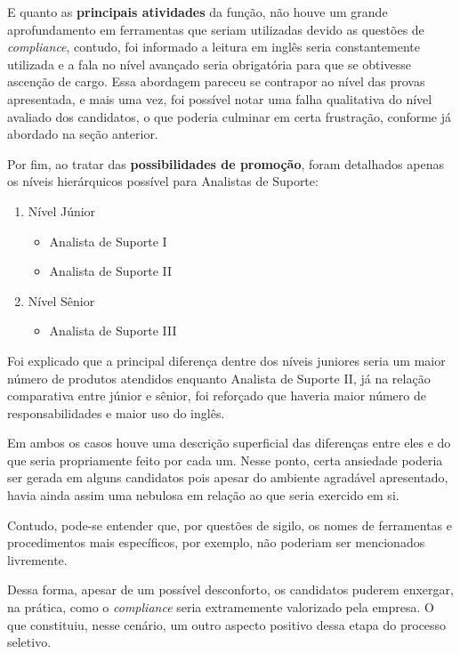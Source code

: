 \documentclass[12pt]{article}
\begin{document}
E quanto as \textbf{principais atividades} da função, não houve um grande aprofundamento em ferramentas que seriam utilizadas devido as questões de \emph{compliance}, contudo, foi informado a leitura em inglês seria constantemente utilizada e a fala no nível avançado seria obrigatória para que se obtivesse ascenção de cargo. Essa abordagem pareceu se contrapor ao nível das provas apresentada, e mais uma vez, foi possível notar uma falha qualitativa do nível avaliado dos candidatos, o que poderia culminar em certa frustração, conforme já abordado na seção anterior. 

Por fim, ao tratar das \textbf{possibilidades de promoção}, foram detalhados apenas os níveis hierárquicos possível para Analistas de Suporte: 

\newpage

\begin{enumerate}
   \item Nível Júnior
   \begin{itemize}
     \item Analista de Suporte I
     \item  Analista de Suporte II
   \end{itemize}
   \item Nível Sênior
   \begin{itemize}
     \item Analista de Suporte III
     \end{itemize}
\end{enumerate}

Foi explicado que a principal diferença dentre dos níveis juniores seria um maior número de produtos atendidos enquanto Analista de Suporte II, já na relação comparativa entre júnior e sênior, foi reforçado que haveria maior número de responsabilidades e maior uso do inglês. 

Em ambos os casos houve uma descrição superficial das diferenças entre eles e do que seria propriamente feito por cada um. Nesse ponto, certa ansiedade poderia ser gerada em alguns candidatos pois apesar do ambiente agradável apresentado, havia ainda assim uma nebulosa em relação ao que seria exercido em si. 

Contudo, pode-se entender que, por questões de sigilo, os nomes de ferramentas e procedimentos mais específicos, por exemplo, não poderiam ser mencionados livremente. 

Dessa forma, apesar de um possível desconforto, os candidatos puderem enxergar, na prática, como o \emph{compliance} seria extramemente valorizado pela empresa. O que constituiu, nesse cenário, um outro aspecto positivo dessa etapa do processo seletivo.
\end{document}
